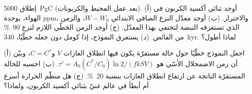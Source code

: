 \begin{exercise}[$\star\star\star$]\label{exo:b2:deep-time-climate:11}
إطلاق \qty{5000}{PgC} (بعد عمل المحيط والكربونات). (أ) أوجد ثنائي أكسيد الكربون في
الهواء، بوحدة ppm، والاحترار. (ب) أوجد معدّل النزع الصافي الابتدائي $W - W_0$، والزمن الذي
تستغرقه النبضة لتختفي بهذا المعدّل. (ج) أوجد الزمن الخطّي اللازم لنزع \qty{90}{\percent}
من الفائض. (د) يستغرق النموذج، إذا كومل دون جعله خطّيًا، \qty{340}{kyr}. لماذا أطول؟
\end{exercise}

\begin{exercise}[$\star\star\star$]\label{exo:b2:deep-time-climate:12}
(أ) اجعل النموذج خطّيًا حول حالة مستقرّة يكون فيها انطلاق الغازات $V$ و$C = C^*$، وبيّن أن
زمن الاضمحلال الأسّي هو $\tau' = A_0 (C^*/C_0)\ln 2/(f k S V)$. (ب) احسبه للحالة المستقرّة
الناتجة عن ارتفاع انطلاق الغازات بنسبة \qty{20}{\percent}. (ج) هل منظّم الحرارة أسرع أم أبطأ في عالم غنيّ
بثنائي أكسيد الكربون، ولماذا؟
\end{exercise}

